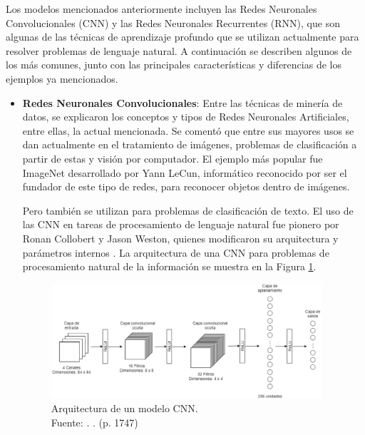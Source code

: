 Los modelos mencionados anteriormente incluyen las Redes Neuronales Convolucionales (CNN) y las Redes Neuronales Recurrentes (RNN), que son algunas de las técnicas de aprendizaje profundo que se utilizan actualmente para resolver problemas de lenguaje natural. A continuación se describen algunos de los más comunes, junto con las principales características y diferencias de los ejemplos ya mencionados.

\begin{itemize}
	\item \textbf{Redes Neuronales Convolucionales}: Entre las técnicas de minería de datos, se explicaron los conceptos y tipos de Redes Neuronales Artificiales, entre ellas, la actual mencionada. Se comentó que entre sus mayores usos se dan actualmente en el tratamiento de imágenes, problemas de clasificación a partir de estas y visión por computador. El ejemplo más popular fue ImageNet desarrollado por Yann LeCun, informático reconocido por ser el fundador de este tipo de redes, para reconocer objetos dentro de imágenes.
	
	Pero también se utilizan para problemas de clasificación de texto. El uso de las CNN en tareas de procesamiento de lenguaje natural fue pionero por Ronan Collobert y Jason Weston, quienes modificaron su arquitectura y parámetros internos \parencite{bk_kamath2019deeplearning_nlp_sr}. La arquitectura de una CNN para problemas de procesamiento natural de la información se muestra en la Figura \ref{2:fig40}.
	\begin{figure}[!ht]
		\begin{center}
			\includegraphics[width=0.95\textwidth]{2/figures/cnn_nlp.png}
			\caption[Arquitectura de un modelo CNN]{Arquitectura de un modelo CNN.\\
			Fuente: \cite{tec_kim2014convolutional}. . (p. 1747)}
			\label{2:fig40}
		\end{center}
	\end{figure}
	

\end{itemize}
